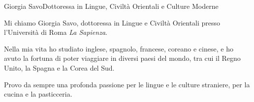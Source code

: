 \documentclass{article}
\begin{document}
\begin{cv}[avatar]{Giorgia Savo}{Dottoressa in Lingue, Civiltà Orientali e Culture Moderne}


\small
Mi chiamo Giorgia Savo, dottoressa in Lingue e Civiltà Orientali presso l'Università di Roma \textit{La Sapienza}.

Nella mia vita ho studiato inglese, spagnolo, francese, coreano e cinese,
e ho avuto la fortuna di poter viaggiare in diversi paesi del mondo, tra cui il Regno Unito, la Spagna e la Corea del Sud.

Provo da sempre una profonda passione per le lingue e le culture straniere, per la cucina e la pasticceria.

\normalsize
{}  %
\small
\begin{cvevent}[Ottobre 2024][Dicembre 2024]
    

\end{cvevent}
\end{cv}
\end{document}
